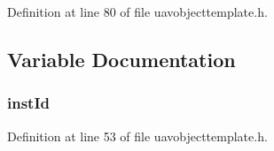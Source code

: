 Definition at line 80 of file uavobjecttemplate.\-h.



\subsection{Variable Documentation}
\hypertarget{group___n_a_m_e_ga874457c6d2526c90ec75fa5a37d687ca}{
\subsubsection[{inst\-Id}]{ inst\-Id}}\label{group___n_a_m_e_ga874457c6d2526c90ec75fa5a37d687ca}


Definition at line 53 of file uavobjecttemplate.\-h.

